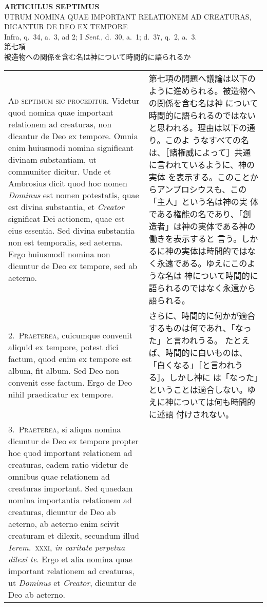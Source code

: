 \documentclass[10pt]{jsarticle}
\begin{document}
\begin{center}
{\Large {\bf ARTICULUS SEPTIMUS}}\\
{\large UTRUM NOMINA QUAE IMPORTANT RELATIONEM AD CREATURAS, DICANTUR
DE DEO EX TEMPORE}\\
{\footnotesize Infra, q.~34, a.~3, ad 2; I {\itshape Sent.}, d.~30,
a.~1; d.~37, q.~2, a.~3.}\\
{\Large 第七項\\被造物への関係を含む名は神について時間的に語られるか}
\end{center}

\begin{longtable}{p{21em}p{21em}}

{\huge A}{\scshape d septimum sic proceditur}. Videtur quod nomina
quae important relationem ad creaturas, non dicantur de Deo ex
tempore. Omnia enim huiusmodi nomina significant divinam substantiam,
ut communiter dicitur. Unde et Ambrosius dicit quod hoc nomen
{\itshape Dominus} est nomen potestatis, quae est divina substantia,
et {\itshape Creator} significat Dei actionem, quae est eius
essentia. Sed divina substantia non est temporalis, sed aeterna. Ergo
huiusmodi nomina non dicuntur de Deo ex tempore, sed ab aeterno.

&

第七項の問題へ議論は以下のように進められる。被造物への関係を含む名は神
について時間的に語られるのではないと思われる。理由は以下の通り。このよ
うなすべての名は、［諸権威によって］共通に言われているように、神の実体
を表示する。このことからアンブロシウスも、この「主人」という名は神の実
体である権能の名であり、「創造者」は神の実体である神の働きを表示すると
言う。しかるに神の実体は時間的ではなく永遠である。ゆえにこのような名は
神について時間的に語られるのではなく永遠から語られる。

\\

2.~{\scshape Praeterea}, cuicumque convenit aliquid ex tempore, potest
dici factum, quod enim ex tempore est album, fit album. Sed Deo non
convenit esse factum. Ergo de Deo nihil praedicatur ex tempore.

&

さらに、時間的に何かが適合するものは何であれ、「なった」と言われうる。
たとえば、時間的に白いものは、「白くなる」［と言われうる］。しかし神に
は「なった」ということは適合しない。ゆえに神については何も時間的に述語
付けされない。

\\

3.~{\scshape Praeterea}, si aliqua nomina dicuntur de Deo ex tempore
propter hoc quod important relationem ad creaturas, eadem ratio
videtur de omnibus quae relationem ad creaturas important. Sed quaedam
nomina importantia relationem ad creaturas, dicuntur de Deo ab
aeterno, ab aeterno enim scivit creaturam et dilexit, secundum illud
{\itshape Ierem}.~{\scshape xxxi}, {\itshape in caritate perpetua
dilexi te}. Ergo et alia nomina quae important relationem ad
creaturas, ut {\itshape Dominus} et {\itshape Creator}, dicuntur de
Deo ab aeterno.


\end{longtable}
\end{document}
